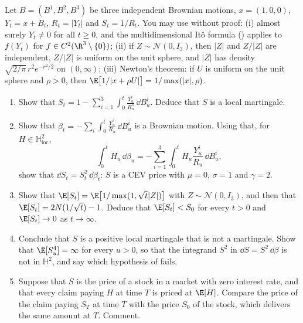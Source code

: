 \begin{exercise}\label{ex:sde-strict}
\hard Let $B=(B^1,B^2,B^3)$ be three independent Brownian motions, $x=(1,0,0)$,
$Y_t=x+B_t$, $R_t=|Y_t|$ and $S_t=1/R_t$. You may use without proof:
(i) almost surely $Y_t\neq0$ for all $t\ge0$, and the multidimensional It\^o formula
() applies to $f(Y_t)$ for $f\in C^2(\R^3\setminus\{0\})$;
(ii) if $Z\sim\mathcal N(0,I_3)$, then $|Z|$ and $Z/|Z|$ are independent, $Z/|Z|$ is uniform on
the unit sphere, and $|Z|$ has density $\sqrt{2/\pi}\,r^2e^{-r^2/2}$ on $(0,\infty)$;
(iii) Newton's theorem: if $U$ is uniform on the unit sphere and $\rho>0$, then
$\E\big[1/|x+\rho U|\big]=1/\max(|x|,\rho)$.
\begin{enumerate}[label=(\alph*)]
  \item Show that $S_t=1-\sum_{i=1}^3\int_0^t\frac{Y^i_u}{R_u^3}\,\dd B^i_u$. Deduce that $S$ is
    a local martingale.
  \item Show that $\beta_t=-\sum_i\int_0^t\frac{Y^i_u}{R_u}\,\dd B^i_u$ is a Brownian
    motion. Using that, for $H\in\mathbb H^2_{\mathrm{loc}}$,
    \[
      \int_0^tH_u\,\dd\beta_u=-\sum_{i=1}^3\int_0^tH_u\frac{Y^i_u}{R_u}\,\dd B^i_u ,
    \]
    show that $\dd S_t=S_t^2\,\dd\beta_t$: $S$ is a CEV
    price with $\mu=0$, $\sigma=1$ and $\gamma=2$.
  \item Show that $\E[S_t]=\E\big[1/\max(1,\sqrt t|Z|)\big]$ with $Z\sim\mathcal N(0,I_3)$,
    and then that $\E[S_t]=2N(1/\sqrt t)-1$. Deduce that $\E[S_t]<S_0$ for every $t>0$ and
    $\E[S_t]\to0$ as $t\to\infty$.
  \item Conclude that $S$ is a positive local martingale that is not a martingale. Show that
    $\E[S_u^4]=\infty$ for every $u>0$, so that the integrand $S^2$ in $\dd S=S^2\,\dd\beta$
    is not in $\mathbb H^2$, and say which hypothesis of  fails.
  \item Suppose that $S$ is the price of a stock in a market with zero interest rate, and that
    every claim paying $H$ at time $T$ is priced at $\E[H]$. Compare the price of the claim
    paying $S_T$ at time $T$ with the price $S_0$ of the stock, which delivers the same amount
    at $T$. Comment.
\end{enumerate}
\end{exercise}

